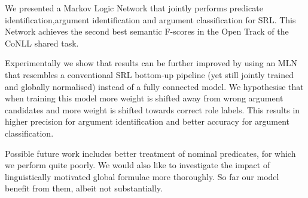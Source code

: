 

We presented a Markov Logic Network that jointly performs predicate identification,argument identification and argument classification for SRL. This Network achieves the second best semantic F-scores in the Open Track of the CoNLL shared task. 

Experimentally we show that results can be further improved by using an MLN that resembles a conventional SRL bottom-up pipeline (yet still jointly trained and globally normalised) instead of a fully connected model. We hypothesise that when training this model more weight is shifted away from wrong argument candidates and more weight is shifted towards correct role labels. This results in higher precision for argument identification and better accuracy for argument classification. 

Possible future work includes better treatment of nominal predicates, for which we perform quite poorly. We would also like to investigate the impact of linguistically motivated global formulae more thoroughly. So far our model benefit from them, albeit not substantially. 

